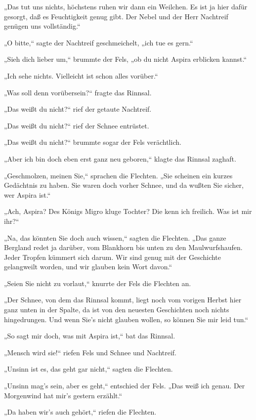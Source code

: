 „Das tut uns nichts, höchstens ruhen wir dann ein Weilchen. Es ist
ja hier dafür gesorgt, daß es Feuchtigkeit genug gibt. Der Nebel
und der Herr Nachtreif genügen uns vollständig.“

„O bitte,“ sagte der Nachtreif geschmeichelt, „ich tue es gern.“

„Sieh dich lieber um,“ brummte der Fels, „ob du nicht Aspira
erblicken kannst.“

„Ich sehe nichts. Vielleicht ist schon alles vorüber.“

„Was soll denn vorübersein?“ fragte das Rinnsal.

„Das weißt du nicht?“ rief der getaute Nachtreif.

„Das weißt du nicht?“ rief der Schnee entrüstet.

„Das weißt du nicht?“ brummte sogar der Fels verächtlich.

„Aber ich bin doch eben erst ganz neu geboren,“ klagte das Rinnsal
zaghaft.

„Geschmolzen, meinen Sie,“ sprachen die Flechten. „Sie scheinen ein
kurzes Gedächtnis zu haben. Sie waren doch vorher Schnee, und da
wußten Sie sicher, wer Aspira ist.“

„Ach, Aspira? Des Königs Migro kluge Tochter? Die kenn ich
freilich. Was ist mir ihr?“

„Na, das könnten Sie doch auch wissen,“ sagten die Flechten. „Das
ganze Bergland redet ja darüber, vom Blankhorn bis unten zu den
Maulwurfshaufen. Jeder Tropfen kümmert sich darum. Wir sind genug
mit der Geschichte gelangweilt worden, und wir glauben kein Wort
davon.“

„Seien Sie nicht zu vorlaut,“ knurrte der Fels die Flechten an.

„Der Schnee, von dem das Rinnsal kommt, liegt noch vom vorigen
Herbst hier ganz unten in der Spalte, da ist von den neuesten
Geschichten noch nichts hingedrungen. Und wenn Sie's nicht glauben
wollen, so können Sie mir leid tun.“

„So sagt mir doch, was mit Aspira ist,“ bat das Rinnsal.

„Mensch wird sie!“ riefen Fels und Schnee und Nachtreif.

„Unsinn ist es, das geht gar nicht,“ sagten die Flechten.

„Unsinn mag's sein, aber es geht,“ entschied der Fels. „Das weiß
ich genau. Der Morgenwind hat mir's gestern erzählt.“

„Da haben wir's auch gehört,“ riefen die Flechten.

